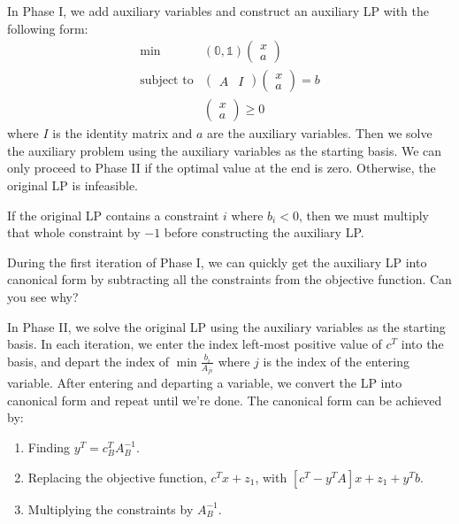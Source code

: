\documentclass[a4paper]{report}
\newcommand\m[1]{\begin{pmatrix}#1\end{pmatrix}}
\begin{document}
\begin{definition}\label{phase:i}
  In Phase I, we add auxiliary variables and construct an auxiliary LP with the following form:
  \begin{equation*}
    \begin{aligned}
      \min & (\mathbb 0, \mathbb 1) \m{x \\ a} \\
      \text{subject to} & \m{A & I} \m{x \\ a} = b \\
      & \m{x \\ a} \geq 0
    \end{aligned}
  \end{equation*}
  where $I$ is the identity matrix and $a$ are the auxiliary variables. Then we solve the auxiliary problem using the
  auxiliary variables as the starting basis. We can only proceed to Phase II if the optimal value at the end is zero. Otherwise, the original LP is infeasible.
  \begin{note}
    If the original LP contains a constraint $i$ where $b_i < 0$, then we must multiply that whole constraint by $-1$ before constructing the auxiliary LP.
  \end{note}
  \begin{tip}
    During the first iteration of Phase I, we can quickly get the auxiliary LP into canonical form by subtracting all the constraints from the objective function. Can you see why?
    \end{tip}
\end{definition}

\begin{definition}
  In Phase II, we solve the original LP using the auxiliary variables as the starting basis. In each iteration, we enter the index left-most positive value of $c^T$ into the basis, and depart the index of $\min \frac {b_i} {A_{ji}}$ where $j$ is the index of the entering variable. After entering and departing a variable, we convert the LP into canonical form and repeat until we're done. The canonical form can be achieved by:
  \begin{enumerate}
    \item Finding $y^T = c_B^T A_B^{-1}$.
    \item Replacing the objective function, $c^T x + z_1$, with $[c^T - y^T A]x + z_1 + y^T b$.
    \item Multiplying the constraints by $A_B^{-1}$.
  \end{enumerate}
\end{definition}
\end{document}

